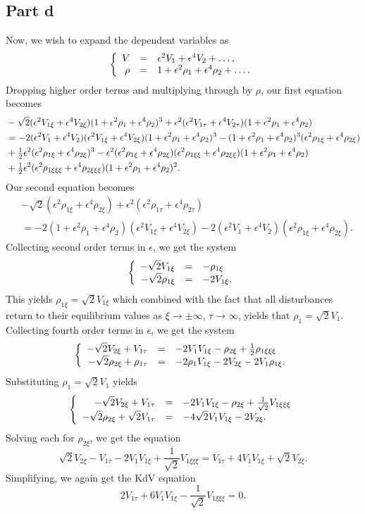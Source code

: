 \documentclass{article}
\begin{document}
\subsection{Part d}
Now, we wish to expand the dependent variables as
\[
\left\{\begin{array}{rcl}
	V&=&\epsilon^2 V_1+\epsilon^4 V_2+\ldots, \\
	\rho&=&1+\epsilon^2 \rho_1+\epsilon^4 \rho_2+\ldots.
\end{array}\right.
\]
Dropping higher order terms and multiplying through by $\rho$, our first equation becomes
\begin{align*}
 &-\sqrt{2}(\epsilon^2V_{1\xi}+\epsilon^4V_{2\xi})(1+\epsilon^2 \rho_1+\epsilon^4 \rho_2)^3+\epsilon^2(\epsilon^2V_{1\tau}+\epsilon^4V_{2\tau})(1+\epsilon^2 \rho_1+\epsilon^4 \rho_2)\\&=
 -2(\epsilon^2 V_1+\epsilon^4 V_2) (\epsilon^2V_{1\xi}+\epsilon^4V_{2\xi})(1+\epsilon^2 \rho_1+\epsilon^4 \rho_2)^3-(1+\epsilon^2 \rho_1+\epsilon^4 \rho_2)^3(\epsilon^2 \rho_{1\xi}+\epsilon^4 \rho_{2\xi})\\&+\mbox{$\frac{1}{2}$}\epsilon^2(\epsilon^2 \rho_{1\xi}+\epsilon^4 \rho_{2\xi})^3-\epsilon^2(\epsilon^2 \rho_{1\xi}+\epsilon^4 \rho_{2\xi})(\epsilon^2 \rho_{1\xi\xi}+\epsilon^4 \rho_{2\xi\xi})(1+\epsilon^2 \rho_{1}+\epsilon^4 \rho_{2})\\&+\mbox{$\frac{1}{2}$}\epsilon^2(\epsilon^2 \rho_{1\xi\xi\xi}+\epsilon^4 \rho_{2\xi\xi\xi})(1+\epsilon^2 \rho_{1}+\epsilon^4 \rho_{2})^2.
\end{align*}
Our second equation becomes
\begin{align*}
&-\sqrt{2}(\epsilon^2 \rho_{1\xi}+\epsilon^4 \rho_{2\xi})+\epsilon^2(\epsilon^2 \rho_{1\tau}+\epsilon^4 \rho_{2\tau})\\&=
-2(1+\epsilon^2 \rho_{1}+\epsilon^4 \rho_{2})(\epsilon^2V_{1\xi}+\epsilon^4V_{2\xi})-2(\epsilon^2V_{1}+\epsilon^4V_{2})(\epsilon^2 \rho_{1\xi}+\epsilon^4 \rho_{2\xi}).
\end{align*}
Collecting second order terms in $\epsilon$, we get the system
\[
\left\{\begin{array}{rcl}
	\displaystyle -\sqrt{2} V_{1\xi}&=&-\rho_{1\xi}\\
	\displaystyle -\sqrt{2} \rho_{1\xi}&=&\displaystyle -2 V_{1\xi}.
\end{array}\right.
\]
This yields $\rho_{1\xi}=\sqrt{2}V_{1\xi}$ which combined with the fact that all disturbances return to their equilibrium values as $\xi\rightarrow \pm \infty$,
$\tau \rightarrow \infty$, yields that $\rho_1=\sqrt{2}V_1$. Collecting fourth order terms in $\epsilon$, we get the system
\[
\left\{\begin{array}{rcl}
	\displaystyle -\sqrt{2}V_{2\xi}+V_{1\tau}&=&-2V_1V_{1\xi}-\rho_{2\xi}+\mbox{$\frac{1}{2}$}\rho_{1\xi\xi\xi}\\
	\displaystyle -\sqrt{2} \rho_{2\xi}+\rho_{1\tau}&=&\displaystyle -2\rho_1 V_{1\xi}-2V_{2\xi}-2V_1\rho_{1\xi}.
\end{array}\right.
\]
Substituting $\rho_1=\sqrt{2}V_1$ yields
\[
\left\{\begin{array}{rcl}
	\displaystyle -\sqrt{2}V_{2\xi}+V_{1\tau}&=&-2V_1V_{1\xi}-\rho_{2\xi}+\frac{1}{\sqrt{2}}V_{1\xi\xi\xi}\\
	\displaystyle -\sqrt{2} \rho_{2\xi}+\sqrt{2}V_{1\tau}&=&\displaystyle -4\sqrt{2}V_1 V_{1\xi}-2V_{2\xi}.
\end{array}\right.
\]
Solving each for $\rho_{2\xi}$, we get the equation
\[
\sqrt{2}V_{2\xi}-V_{1\tau}-2V_1V_{1\xi}+\frac{1}{\sqrt{2}}V_{1\xi\xi\xi}=V_{1\tau}+4V_1 V_{1\xi}+\sqrt{2}V_{2\xi}.
\]
Simplifying, we again get the KdV equation
\[
2V_{1\tau}+6V_1V_{1\xi}-\frac{1}{\sqrt{2}}V_{1\xi\xi\xi}=0.
\]
\end{document}

